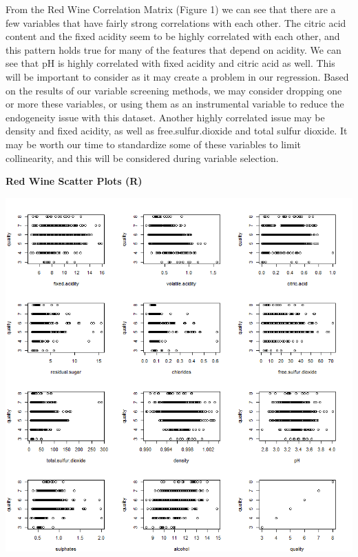 \documentclass{article}
\begin{document}
	From the Red Wine Correlation Matrix (Figure 1) we can see that there are a few variables that have fairly strong 
	correlations with each other. The citric acid content and the fixed acidity seem to be highly correlated 
	with each other, and this pattern holds true for many of the features that depend on acidity. We can see 
	that pH is highly correlated with fixed acidity and citric acid as well. This will be important to consider 
	as it may create a problem in our regression. Based on the results of our variable screening methods, we may
	consider dropping one or more these variables, or using them as an instrumental variable to reduce the 
	endogeneity issue with this dataset. Another highly correlated issue may be density and fixed acidity, as well 
	as free.sulfur.dioxide and total sulfur dioxide. It may be worth our time to standardize some of these 
	variables to limit collinearity, and this will be considered during variable selection. 
	
	
	\newpage 
	
	\textbf{Red Wine Scatter Plots (R)}
	
	\includegraphics[scale=0.7]{../plots/Wine/red_wine_Rscatter.png}
	\newline
	
\end{document}

